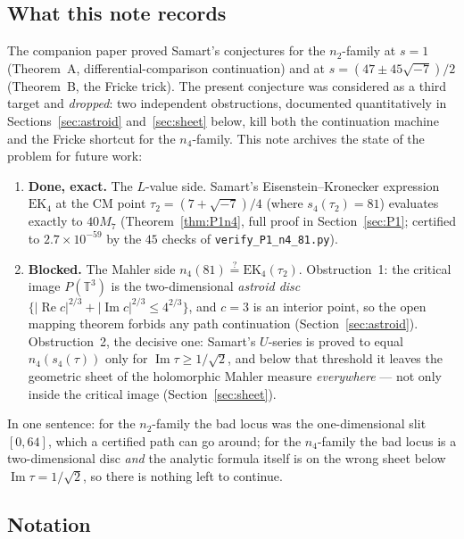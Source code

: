 \documentclass[11pt]{article}
\theoremstyle{definition}
\theoremstyle{remark}
\newcommand{\Tt}{\mathbb{T}}
\newcommand{\ImT}{\operatorname{Im}}
\newcommand{\ReT}{\operatorname{Re}}
\begin{document}
\subsection{What this note records}

The companion paper \cite{Zf} proved Samart's conjectures for the
$n_2$-family at $s=1$ (Theorem~A, differential-comparison continuation)
and at $s=(47\pm45\sqrt{-7})/2$ (Theorem~B, the Fricke trick). The
present conjecture was considered as a third target and \emph{dropped}:
two independent obstructions, documented quantitatively in
Sections~\ref{sec:astroid} and~\ref{sec:sheet} below, kill both the
continuation machine and the Fricke shortcut for the $n_4$-family. This
note archives the state of the problem for future work:

\begin{enumerate}
\item[(P1)] \textbf{Done, exact.} The $L$-value side. Samart's
Eisenstein--Kronecker expression $\mathrm{EK}_4$ at the CM point
$\tau_2=(7+\sqrt{-7})/4$ (where $s_4(\tau_2)=81$) evaluates exactly to
$40M_7$ (Theorem~\ref{thm:P1n4}, full proof in
Section~\ref{sec:P1}; certified to $2.7\times10^{-59}$ by the $45$
checks of \texttt{verify\_P1\_n4\_81.py}).
\item[(P2)] \textbf{Blocked.} The Mahler side
$n_4(81)\stackrel{?}{=}\mathrm{EK}_4(\tau_2)$. Obstruction~1: the
critical image $P(\Tt^3)$ is the two-dimensional \emph{astroid disc}
$\{|{\ReT c}|^{2/3}+|{\ImT c}|^{2/3}\le4^{2/3}\}$, and $c=3$ is an
interior point, so the open mapping theorem forbids any path
continuation (Section~\ref{sec:astroid}). Obstruction~2, the decisive
one: Samart's $U$-series is proved to equal $n_4(s_4(\tau))$ only for
$\ImT\tau\ge1/\sqrt2$, and below that threshold it leaves the geometric
sheet of the holomorphic Mahler measure \emph{everywhere} --- not only
inside the critical image (Section~\ref{sec:sheet}).
\end{enumerate}

In one sentence: for the $n_2$-family the bad locus was the
one-dimensional slit $[0,64]$, which a certified path can go around; for
the $n_4$-family the bad locus is a two-dimensional disc \emph{and} the
analytic formula itself is on the wrong sheet below $\ImT\tau=1/\sqrt2$,
so there is nothing left to continue.

\subsection{Notation}
\end{document}
